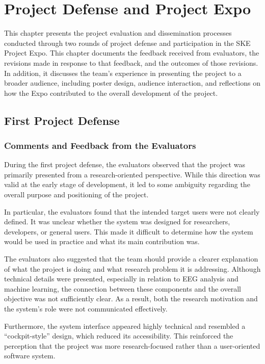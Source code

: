 \chapter{Project Defense and Project Expo}
\label{chap:project-defense-expo}

\noindent
This chapter presents the project evaluation and dissemination processes conducted through
two rounds of project defense and participation in the SKE Project Expo. This chapter
documents the feedback received from evaluators, the revisions made in response to that
feedback, and the outcomes of those revisions. In addition, it discusses the team's experience
in presenting the project to a broader audience, including poster design, audience interaction,
and reflections on how the Expo contributed to the overall development of the project.

\section{First Project Defense}
\label{sec:first-defense}

\subsection{Comments and Feedback from the Evaluators}
\label{subsec:first-defense-feedback}

During the first project defense, the evaluators observed that the project was primarily presented from a research-oriented perspective. While this direction was valid at the early stage of development, it led to some ambiguity regarding the overall purpose and positioning of the project.

In particular, the evaluators found that the intended target users were not clearly defined. It was unclear whether the system was designed for researchers, developers, or general users. This made it difficult to determine how the system would be used in practice and what its main contribution was.

The evaluators also suggested that the team should provide a clearer explanation of what the project is doing and what research problem it is addressing. Although technical details were presented, especially in relation to EEG analysis and machine learning, the connection between these components and the overall objective was not sufficiently clear. As a result, both the research motivation and the system’s role were not communicated effectively.

Furthermore, the system interface appeared highly technical and resembled a “cockpit-style” design, which reduced its accessibility. This reinforced the perception that the project was more research-focused rather than a user-oriented software system.

